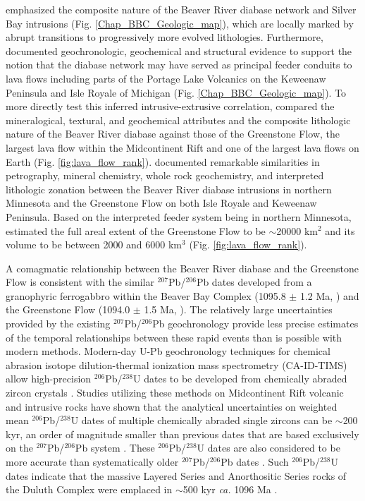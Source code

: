 \cite{Miller1997a} emphasized the composite nature of the Beaver River diabase network and Silver Bay intrusions (Fig. \ref{Chap_BBC_Geologic_map}), which are locally marked by abrupt transitions to progressively more evolved lithologies. Furthermore, \cite{Miller1997a} documented geochronologic, geochemical and structural evidence to support the notion that the diabase network may have served as principal feeder conduits to lava flows including parts of the Portage Lake Volcanics on the Keweenaw Peninsula and Isle Royale of Michigan (Fig. \ref{Chap_BBC_Geologic_map}). To more directly test this inferred intrusive-extrusive correlation, \cite{Doyle2016a} compared the mineralogical, textural, and geochemical attributes and the composite lithologic nature of the Beaver River diabase against those of the Greenstone Flow, the largest lava flow within the Midcontinent Rift and one of the largest lava flows on Earth (Fig. \ref{fig:lava_flow_rank}). \cite{Doyle2016a} documented remarkable similarities in petrography, mineral chemistry, whole rock geochemistry, and interpreted lithologic zonation between the Beaver River diabase intrusions in northern Minnesota and the Greenstone Flow on both Isle Royale and Keweenaw Peninsula. Based on the interpreted feeder system being in northern Minnesota, \cite{Doyle2016a} estimated the full areal extent of the Greenstone Flow to be $\sim$20000 km$^2$ and its volume to be between 2000 and 6000 km$^3$ (Fig. \ref{fig:lava_flow_rank}). 

A comagmatic relationship between the Beaver River diabase and the Greenstone Flow is consistent with the similar $^{207}$Pb/$^{206}$Pb dates developed from a granophyric ferrogabbro within the Beaver Bay Complex (1095.8 $\pm$ 1.2 Ma, \cite{Paces1993a}) and the Greenstone Flow (1094.0 $\pm$ 1.5 Ma, \cite{Davis1990a}). The relatively large uncertainties provided by the existing $^{207}$Pb/$^{206}$Pb geochronology provide less precise estimates of the temporal relationships between these rapid events than is possible with modern methods. Modern-day U-Pb geochronology techniques for chemical abrasion isotope dilution-thermal ionization mass spectrometry (CA-ID-TIMS) allow high-precision $^{206}$Pb/$^{238}$U dates to be developed from chemically abraded zircon crystals \citep{Mattinson2005a}. Studies utilizing these methods on Midcontinent Rift volcanic and intrusive rocks have shown that the analytical uncertainties on weighted mean $^{206}$Pb/$^{238}$U dates of multiple chemically abraded single zircons can be $\sim$200 kyr, an order of magnitude smaller than previous dates that are based exclusively on the $^{207}$Pb/$^{206}$Pb system \citep{Fairchild2017a, Swanson-Hysell2019a, Swanson-Hysell2021a}. These $^{206}$Pb/$^{238}$U dates are also considered to be more accurate than systematically older $^{207}$Pb/$^{206}$Pb dates \citep{Schoene2006a}. Such $^{206}$Pb/$^{238}$U dates indicate that the massive Layered Series and Anorthositic Series rocks of the Duluth Complex were emplaced in $\sim$500 kyr \textit{ca.} 1096 Ma \citep{Swanson-Hysell2021a}.  

